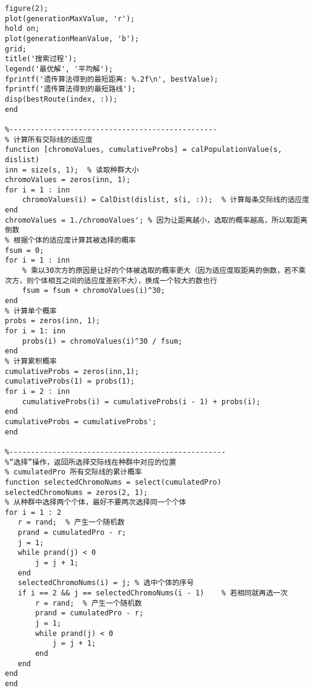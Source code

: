 \documentclass{article}
\begin{document}
\begin{appendices}
\begin{lstlisting}
figure(2);
plot(generationMaxValue, 'r');  
hold on;
plot(generationMeanValue, 'b'); 
grid;
title('搜索过程');
legend('最优解', '平均解');
fprintf('遗传算法得到的最短距离: %.2f\n', bestValue);
fprintf('遗传算法得到的最短路线');
disp(bestRoute(index, :));
end
 
%------------------------------------------------
% 计算所有交际线的适应度
function [chromoValues, cumulativeProbs] = calPopulationValue(s, dislist)
inn = size(s, 1);  % 读取种群大小
chromoValues = zeros(inn, 1);
for i = 1 : inn
    chromoValues(i) = CalDist(dislist, s(i, :));  % 计算每条交际线的适应度
end
chromoValues = 1./chromoValues'; % 因为让距离越小，选取的概率越高，所以取距离倒数
% 根据个体的适应度计算其被选择的概率
fsum = 0;
for i = 1 : inn
    % 乘以30次方的原因是让好的个体被选取的概率更大（因为适应度取距离的倒数，若不乘次方，则个体相互之间的适应度差别不大），换成一个较大的数也行
    fsum = fsum + chromoValues(i)^30;   
end
% 计算单个概率
probs = zeros(inn, 1);
for i = 1: inn
    probs(i) = chromoValues(i)^30 / fsum;
end
% 计算累积概率
cumulativeProbs = zeros(inn,1);
cumulativeProbs(1) = probs(1);
for i = 2 : inn
    cumulativeProbs(i) = cumulativeProbs(i - 1) + probs(i);
end
cumulativeProbs = cumulativeProbs';
end
 
%--------------------------------------------------
%“选择”操作，返回所选择交际线在种群中对应的位置
% cumulatedPro 所有交际线的累计概率
function selectedChromoNums = select(cumulatedPro)
selectedChromoNums = zeros(2, 1);
% 从种群中选择两个个体，最好不要两次选择同一个个体
for i = 1 : 2
   r = rand;  % 产生一个随机数
   prand = cumulatedPro - r;
   j = 1;
   while prand(j) < 0
       j = j + 1;
   end
   selectedChromoNums(i) = j; % 选中个体的序号
   if i == 2 && j == selectedChromoNums(i - 1)    % 若相同就再选一次
       r = rand;  % 产生一个随机数
       prand = cumulatedPro - r;
       j = 1;
       while prand(j) < 0
           j = j + 1;
       end
   end
end
end
 

\end{lstlisting}
\end{appendices}
\end{document}
